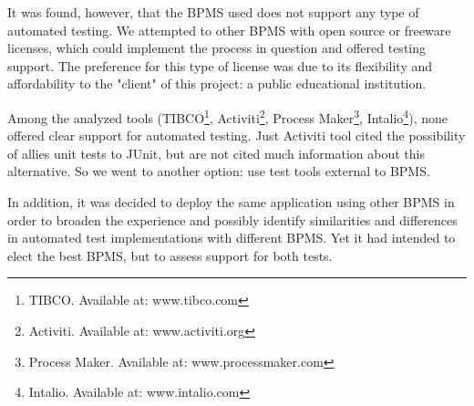\documentclass[runningheads,a4paper]{llncs}
\begin{document}
It was found, however, that the BPMS used does not support any type of automated testing. We attempted to other BPMS with open source or freeware licenses, which could implement the process in question and offered testing support. The preference for this type of license was due to its flexibility and affordability to the "client" of this project: a public educational institution.

Among the analyzed tools (TIBCO\footnote{TIBCO. Available at: www.tibco.com}, Activiti\footnote{Activiti. Available at: www.activiti.org}, Process Maker\footnote{Process Maker. Available at: www.processmaker.com}, Intalio\footnote{Intalio. Available at: www.intalio.com}), none offered clear support for automated testing. Just Activiti tool cited the possibility of allies unit tests to JUnit, but are not cited much information about this alternative. So we went to another option: use test tools external to BPMS.

In addition, it was decided to deploy the same application using other BPMS in order to broaden the experience and possibly identify similarities and differences in automated test implementations with different BPMS. Yet it had intended to elect the best BPMS, but to assess support for both tests.
\end{document}

